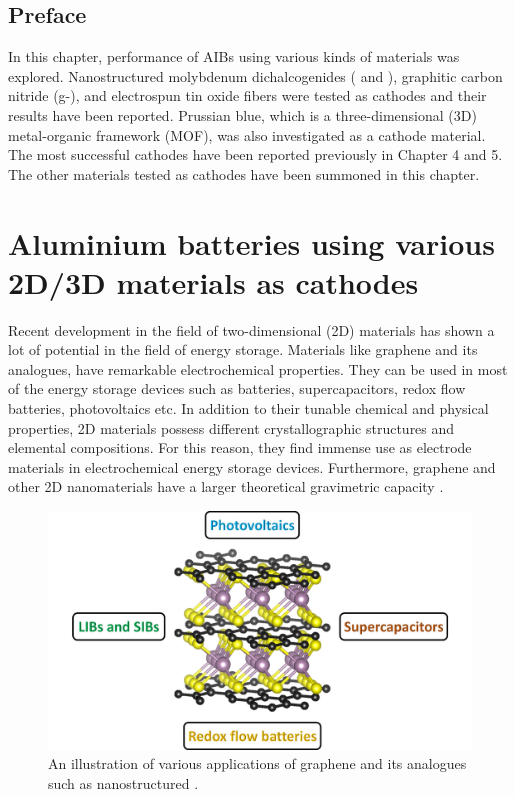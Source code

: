 \section*{Preface}
In this chapter, performance of AIBs using various kinds of materials was explored. Nanostructured molybdenum dichalcogenides ( and ), graphitic carbon nitride (g-), and electrospun tin oxide  fibers were tested as cathodes and their results have been reported. Prussian blue, which is a three-dimensional (3D) metal-organic framework (MOF), was also investigated as a cathode material. The most successful cathodes have been reported previously in Chapter 4 and 5. The other materials tested as cathodes have been summoned in this chapter. 
\pagebreak
\chapter{Aluminium batteries using various 2D/3D materials as cathodes} 
\label{chap6} 
Recent development in the field of two-dimensional (2D) materials has shown a lot of potential in the field of energy storage. Materials like graphene and its analogues, have remarkable electrochemical properties. They can be used in most of the energy storage devices such as batteries, supercapacitors, redox flow batteries, photovoltaics etc. In addition to their tunable chemical and physical properties, 2D materials possess different crystallographic structures and elemental compositions. For this reason, they find immense use as electrode materials in electrochemical energy storage devices\cite{wang_graphene_2009,bonaccorso_graphene_2015}. Furthermore, graphene and other 2D nanomaterials have a larger theoretical gravimetric capacity \cite{zhou_progress_2014}. 

\begin{figure}[h!]
  \centering
  \includegraphics[width=\textwidth]{Figures/chap6fig/nanoTMDintro.pdf}
    \caption{An illustration of various applications of graphene and its analogues such as nanostructured .}
  \label{Figures/chap6fig:nanoTMDintro}
\end{figure}

